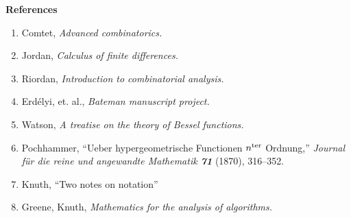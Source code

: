 \documentclass[12pt]{article}
\begin{document}
{\bf References}
\begin{enumerate}
\item Comtet,  {\em Advanced combinatorics.}
\item Jordan, {\em Calculus of finite differences.}
\item Riordan, {\em Introduction to combinatorial analysis.}
\item Erd\'elyi, et. al., {\em Bateman manuscript project.}
\item Watson, {\em A treatise on the theory of Bessel functions.}\ 
\item Pochhammer, ``Ueber hypergeometrische Functionen $n^{\rm ter}$
  Ordnung,'' {\sl Journal f\"ur die reine und angewandte Mathematik\/
    \bf 71} (1870), 316--352.
\item Knuth, ``Two notes on notation'' 
\item Greene, Knuth, {\em Mathematics for the analysis of algorithms.}
\end{enumerate}
\end{document}
